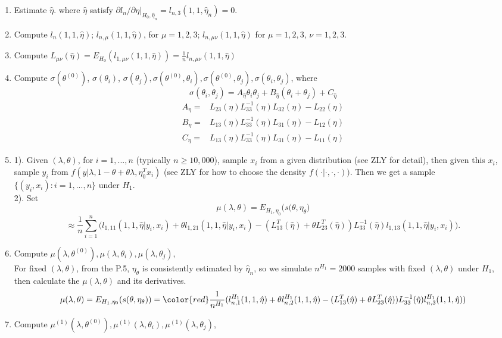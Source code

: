 \documentclass{article}
\begin{document}
\begin{enumerate}[step 1]
\item Estimate $\hat{\eta}$. where $\hat{\eta}$ satisfy $\partial l_n/\partial \eta|_{H_0,\hat{\eta}_n}= l_{n,3}(1,1,\hat{\eta}_n)=0$.
\item Compute $l_n(1,1,\hat{\eta})$; $l_{n,\mu}(1,1,\hat{\eta})$, for $\mu= 1,2,3$; $l_{n,\mu\nu}(1,1,\hat{\eta})$ for $\mu= 1,2,3$, $\nu=1,2,3$.
\item Compute $L_{\mu\nu}(\hat{\eta}) = E_{H_0}(l_{1,{\mu\nu}}(1,1,\hat{\eta})) =\frac{1}{n}l_{n,\mu\nu}(1,1,\hat{\eta}) $
\item Compute $\sigma(\theta^{(0)})$, $\sigma(\theta_i)$, $\sigma(\theta_j), \sigma(\theta^{(0)},\theta_i), \sigma(\theta^{(0)},\theta_j), \sigma(\theta_i,\theta_j)$, where $$\sigma(\theta_i,\theta_j) =A_{\hat{\eta}}\theta_i\theta_j+B_{\hat{\eta}}(\theta_i+\theta_j)+C_{\hat{\eta}}$$
\begin{align*}
 A_\eta =& L_{23}(\eta)L_{33}^{-1}(\eta)L_{32}(\eta)-L_{22}(\eta)\\
 B_\eta =& L_{13}(\eta)L_{33}^{-1}(\eta)L_{31}(\eta)-L_{12}(\eta)\\
 C_\eta =& L_{13}(\eta)L_{33}^{-1}(\eta)L_{31}(\eta)-L_{11}(\eta)
\end{align*}
\item  1).  Given $(\lambda,\theta)$, for $i=1,...,n$ (typically $n\geq 10,000$), sample $x_i$ from a given distribution (see ZLY for detail), then given this $x_i$, sample $y_i$ from $f(y|\lambda,1-\theta+\theta \lambda,\eta^T_0 x_i)$ (see ZLY for how to choose the density $f(\cdot|\cdot,\cdot,\cdot))$. Then we get a sample $\{(y_i,x_i): i=1,...,n\}$ under $H_1$.
 \\
 2). Set
 $$ \mu(\lambda,\theta) = E_{H_1,\eta_0}\big(s(\theta,\eta_\theta\big) $$
 $$ \approx \frac{1}{n}\sum_{i=1}^n\Big(l_{1,11}(1,1,\hat{\eta}|y_i,x_i)
+\theta l_{1,21}(1,1,\hat{\eta}|y_i,x_i) -(L^T_{13}(\hat{\eta})+\theta L^T_{23}(\hat{\eta}))L_{33}^{-1}(\hat{\eta})l_{1,13}(1,1,\hat{\eta}|y_i,x_i)\Big). $$
\item Compute $\mu(\lambda,\theta^{(0)}),\mu(\lambda,\theta_i),\mu(\lambda,\theta_j)$,\\
{\color{blue}For fixed $(\lambda,\theta)$, from the P.5, $\eta_\theta$ is consistently estimated by $\hat{\eta}_n$, so we simulate $n^{H_1}=2000$ samples with fixed $(\lambda,\theta)$ under $H_1$, then calculate the $\mu(\lambda,\theta)$ and its derivatives.}
$$\mu(\lambda,\theta)= E_{H_1,\eta_0}(s(\theta,\eta_{\theta}))= {\color{red} \frac{1}{n^{H_1}}(l^{H_1}_{n,1}(1,1,\hat{\eta})+\theta l^{H_1}_{n,2}(1,1,\hat{\eta})- (L_{13}^T(\hat{\eta})+\theta L_{23}^T(\hat{\eta}))L_{33}^{-1}(\hat{\eta})l^{H_1}_{n,3}(1,1,\hat{\eta}))}$$
\item Compute $\mu^{(1)}(\lambda,\theta^{(0)}),\mu^{(1)}(\lambda,\theta_i),\mu^{(1)}(\lambda,\theta_j)$,


\end{enumerate}
\end{document}
